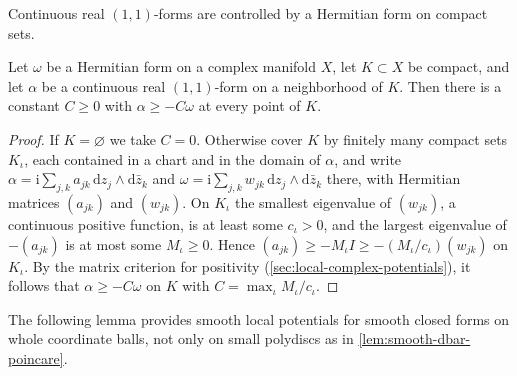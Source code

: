 Continuous real $(1,1)$-forms are controlled by a Hermitian form on compact sets.

\begin{lemma}\label{lem:hermitian-form-comparison}
Let $\omega$ be a Hermitian form on a complex manifold $X$, let $K\subset X$ be compact, and let $\alpha$ be a continuous real $(1,1)$-form on a neighborhood of $K$. Then there is a constant $C\geq0$ with $\alpha\geq-C\omega$ at every point of $K$.
\end{lemma}
\begin{proof}
If $K=\varnothing$ we take $C=0$. Otherwise cover $K$ by finitely many compact sets $K_\iota$, each contained in a chart and in the domain of $\alpha$, and write $\alpha=\mathrm i\sum_{j,k}a_{jk}\,\mathrm dz_j\wedge\mathrm d\bar z_k$ and $\omega=\mathrm i\sum_{j,k}w_{jk}\,\mathrm dz_j\wedge\mathrm d\bar z_k$ there, with Hermitian matrices $(a_{jk})$ and $(w_{jk})$. On $K_\iota$ the smallest eigenvalue of $(w_{jk})$, a continuous positive function, is at least some $c_\iota>0$, and the largest eigenvalue of $-(a_{jk})$ is at most some $M_\iota\geq0$. Hence $(a_{jk})\geq-M_\iota I\geq-(M_\iota/c_\iota)(w_{jk})$ on $K_\iota$. By the matrix criterion for positivity (\cref{sec:local-complex-potentials}), it follows that $\alpha\geq-C\omega$ on $K$ with $C=\max_\iota M_\iota/c_\iota$.
\end{proof}

The following lemma provides smooth local potentials for smooth closed forms on whole coordinate balls, not only on small polydiscs as in \cref{lem:smooth-dbar-poincare}.

